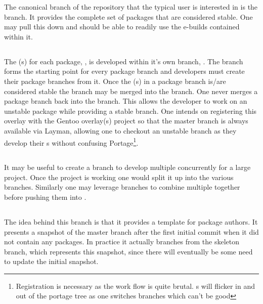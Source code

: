 \documentclass{article}
\begin{document}
The canonical branch of the repository that the typical user is interested in is the  branch. 
It provides the complete set of packages that are considered stable.
One may pull this down and should be able to readily use the e-builds contained within it.

\subsection{}

The \eBuild{}(s) for each package, , is developed within it's own branch, . 
The  branch forms the starting point for every package branch and developers must create their package branches from it.
Once the \eBuild{}(s) in a package branch is/are considered stable the branch may be merged into the  branch.
One never merges a package branch back into the  branch.
This allows the developer to work on an unstable package while providing a stable  branch.
One intends on registering this overlay with the Gentoo overlay(s) project so that the master branch is always available via Layman, allowing one to checkout an unstable branch as they develop their \eBuild{}s without confusing Portage\footnote{Registration is necessary as the work flow is quite brutal. \eBuild{}s will flicker in and out of the portage tree as one switches branches which can't be good}.

\subsection{}

It may be useful to create a  branch to develop multiple  concurrently for a large project.
Once the project is working one would split it up into the various  branches.
Similarly one may leverage  branches to combine multiple  together before pushing them into .

\subsection{}

The idea behind this branch is that it provides a template for package authors.
It presents a snapshot of the master branch after the first initial commit when it did not contain any packages.
In practice it actually branches from the skeleton branch, which represents this snapshot, since there will eventually be some need to update the initial snapshot.
\end{document}
